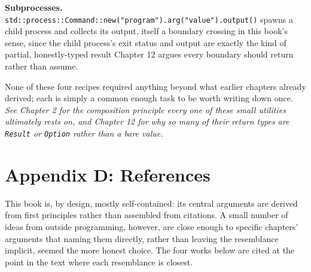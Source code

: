\documentclass[11pt]{book}
\begin{document}
\textbf{Subprocesses.} \texttt{std::process::Command::new("program").arg("value").output()} spawns a child process and collects its output, itself a boundary crossing in this book's sense, since the child process's exit status and output are exactly the kind of partial, honestly-typed result Chapter 12 argues every boundary should return rather than assume.

None of these four recipes required anything beyond what earlier chapters already derived; each is simply a common enough task to be worth writing down once. \emph{See Chapter 2 for the composition principle every one of these small utilities ultimately rests on, and Chapter 12 for why so many of their return types are \texttt{Result} or \texttt{Option} rather than a bare value.}

\clearpage

\chapter*{Appendix D: References}

This book is, by design, mostly self-contained: its central arguments are derived from first principles rather than assembled from citations. A small number of ideas from outside programming, however, are close enough to specific chapters' arguments that naming them directly, rather than leaving the resemblance implicit, seemed the more honest choice. The four works below are cited at the point in the text where each resemblance is closest.
\end{document}
